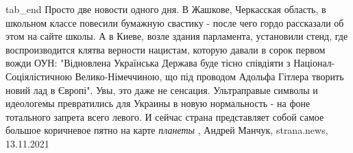   tab_end
\fi
Просто две новости одного дня.  В Жашкове, Черкасская область, в школьном
классе повесили бумажную свастику - после чего гордо рассказали об этом на
сайте школы.  А в Киеве, возле здания парламента, установили стенд, где
воспроизводится клятва верности нацистам, которую давали в сорок первом вожди
ОУН: "Відновлена Українська Держава буде тісно співдіяти з
Націонал-Соціялістичною Велико-Німеччиною, що під проводом Адольфа Гітлера
творить новий лад в Європі". Увы, это даже не сенсация. Ультраправые символы и
идеологемы превратились для Украины в новую нормальность - на фоне тотального
запрета всего левого. И сейчас страна представляет собой самое большое
коричневое пятно на карте \emph{планеты}
, 
Андрей Манчук, strana.news, 13.11.2021
